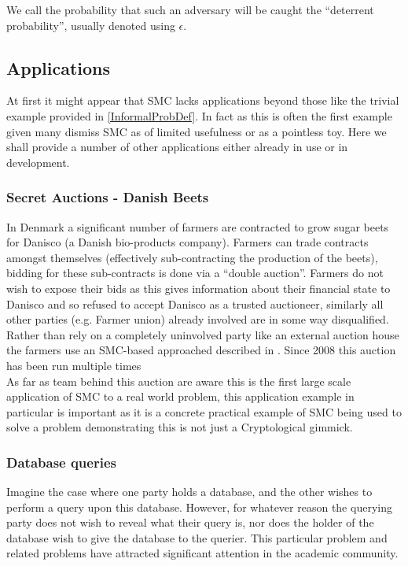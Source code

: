 \documentclass[a4paper,10pt]{article}
\begin{document}
				We call the probability that such an adversary will be caught the ``deterrent probability'', usually denoted using $\epsilon$.


		\subsection{Applications} \label{Applications}
			At first it might appear that SMC lacks applications beyond those like the trivial example provided in \ref{InformalProbDef}. In fact as this is often the first example given many dismiss SMC as of limited usefulness or as a pointless toy. Here we shall provide a number of other applications either already in use or in development.


			\subsubsection{Secret Auctions - Danish Beets} \label{BeetsAuctionApplication}
				In Denmark a significant number of farmers are contracted to grow sugar beets for Danisco (a Danish bio-products company). Farmers can trade contracts amongst themselves (effectively sub-contracting the production of the beets), bidding for these sub-contracts is done via a ``double auction''. Farmers do not wish to expose their bids as this gives information about their financial state to Danisco and so refused to accept Danisco as a trusted auctioneer, similarly all other parties (e.g. Farmer union) already involved are in some way disqualified. Rather than rely on a completely uninvolved party like an external auction house the farmers use an SMC-based approached described in \cite{SugarBeets}. Since 2008 this auction has been run multiple times \\

				As far as team behind this auction are aware this is the first large scale application of SMC to a real world problem, this application example in particular is important as it is a concrete practical example of SMC being used to solve a problem demonstrating this is not just a Cryptological gimmick.

			\subsubsection{Database queries} \label{LegalDatabaseApplication}
				Imagine the case where one party holds a database, and the other wishes to perform a query upon this database. However, for whatever reason the querying party does not wish to reveal what their query is, nor does the holder of the database wish to give the database to the querier. This particular problem and related problems have attracted significant attention in the academic community.
\end{document}
